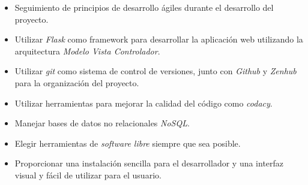 \begin{itemize}
	\item Seguimiento de principios de desarrollo ágiles durante el desarrollo del proyecto.
	\item Utilizar \textit{Flask} como framework para desarrollar la aplicación web utilizando la arquitectura \textit{Modelo Vista Controlador}.
	\item Utilizar \textit{git} como sistema de control de versiones, junto con \textit{Github} y \textit{Zenhub} para la organización del proyecto.
	\item Utilizar herramientas para mejorar la calidad del código como \textit{codacy}.
	\item Manejar bases de datos no relacionales \textit{NoSQL}.
	\item Elegir herramientas de \textit{software libre} siempre que sea posible.
	\item Proporcionar una instalación sencilla para el desarrollador y una interfaz visual y fácil de utilizar para el usuario.
\end{itemize}


